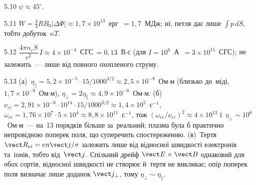 \begin{Solution}{5.{10}}
		$\psi\approx45^\circ$.
	
\end{Solution}
\begin{Solution}{5.{11}}
		$W=\tfrac34RB_0|\Delta\Phi|\approx1{,}7\times10^{13}$~ерг~$=1{,}7$~МДж; ні, петля дає лише $\int p\,dS$, тобто добуток~$nT$.
	
\end{Solution}
\begin{Solution}{5.{12}}
		$\dfrac{4\pi n_cS}{c^2}\,I\approx4\times10^{-4}$~СГС$\,=0{,}13$~В$\cdot$с (для $I=10^6$~А~$=3\times10^{15}$~СГС);
не залежить~--- лише від повного охопленого струму.
	
\end{Solution}
\begin{Solution}{5.{13}}
		(а)~$\eta_\parallel=5{,}2\times10^{-5}\cdot15/1000^{3/2}\approx2{,}5\times10^{-8}$~Ом$\cdot$м
		(близько до~міді, $1{,}7\times10^{-8}$~Ом$\cdot$м), $\eta_\perp=2\eta_\parallel\approx4{,}9\times10^{-8}$~Ом$\cdot$м.
		(б)~$\nu_{ei}=2{,}91\times10^{-6}\cdot10^{14}\cdot15/1000^{3/2}\approx1{,}4\times10^{5}$~с$^{-1}$,
		$\omega_{ce}=1{,}76\times10^{7}\cdot5\times10^{4}\approx8{,}8\times10^{11}$~с$^{-1}$, тож
		$(\omega_{ce}/\nu_{ei})^2\approx4\times10^{13}$ і~$\eta_\perp\sim10^{6}$~Ом$\cdot$м~--- на~13 порядків більше за~реальний; плазма
		була б практично непровідною поперек поля, що суперечить спостереженню.
		(в)~Тертя $\vect R_{ei}=en\vect j/\sigma$ залежить лише від відносної швидкості електронів та~іонів, тобто від~$\vect j$.
		Спільний дрейф $\vect E\times\vect B$ однаковий для обох сортів, відносної швидкості не створює й~тертя не викликає;
		опір поперек поля визначає лише доданок $\vect j_\perp$, тому $\eta_\perp\sim\eta_\parallel$.
	
\end{Solution}

